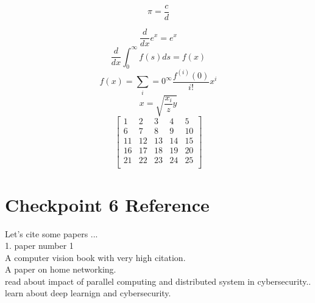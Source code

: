 \documentclass[a4paper,12pt]{article}
\begin{document}
\begin{equation}
    \pi = \frac{c}{d}
\end{equation}

\begin{equation}
    \frac{d}{dx}e^x = e^x
\end{equation}
\begin{equation}
    \frac{d}{dx} \int_0^\infty f(s)ds = f(x)
\end{equation}
 \begin{equation}
     f(x)=\sum_{i} = 0^\infty \frac{f^(i)(0)}{i!}x^i
 \end{equation}
 \begin{equation}
     x = \sqrt{\frac{x_i}{z}y}
 \end{equation}
\begin{equation}
\left[
\begin{matrix}
1 &2& 3& 4& 5\\
6 &7 & 8 & 9 & 10\\
11 & 12 & 13 & 14 & 15\\
16 & 17 & 18 & 19 & 20\\
21 & 22 & 23 & 24 &  25\\
\end{matrix}
\right]
\end{equation}

\newpage

\section{Checkpoint 6 Reference}
\vspace{12pt}
Let's cite some papers ...\\


1. paper number 1\cite{appice2020multi}\\


A computer vision book with very high citation.\cite{forsyth2011computer}\\


A paper on home networking.\cite{callaway2002home}\\


read about impact of parallel computing and distributed system in cybersecurity.\cite{kumar2005parallel}.\\


learn about deep learnign and cybersecurity.\cite{roopak2019deep}\\



\end{document}
